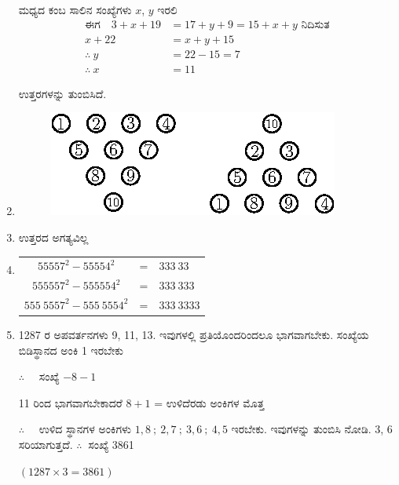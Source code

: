 \begin{enumerate}
ಮಧ್ಯದ ಕಂಬ ಸಾಲಿನ ಸಂಖ್ಯೆಗಳು $x$, $y$ ಇರಲಿ 
\begin{align*}
\text{ಈಗ}\quad 3 + x + 19 & = 17 + y + 9 = 15 + x + y \text{ ನಿದಿಸುತ} \\
x + 22 & = x + y + 15\\
\therefore~ y & = 22 - 15 = 7\\
\therefore~ x & = 11
\end{align*}

ಉತ್ತರಗಳನ್ನು ತುಂಬಿಸಿದೆ. 

\item 
\begin{figure}[H]
\centering
\includegraphics{images/chap10/ans27.eps}
\end{figure}

\item ಉತ್ತರದ ಅಗತ್ಯವಿಲ್ಲ 

\item 
\begin{tabular}[t]{ccl}
$55557^{2} - 55554^{2}$ & = & $333~33$\\
$555557^{2} - 555554^{2}$ & = & $333~333$\\
$555~5557^{2} - 555~5554^{2}$ & = & $333~3333$
\end{tabular}

\item 1287 ರ ಅಪವರ್ತನಗಳು 9, 11, 13. ಇವುಗಳಲ್ಲಿ ಪ್ರತಿಯೊಂದರಿಂದಲೂ ಭಾಗವಾಗಬೇಕು. ಸಂಖ್ಯೆಯ ಬಿಡಿಸ್ಥಾನದ ಅಂಕಿ 1 ಇರಬೇಕು 

$\therefore\quad$ ಸಂಖ್ಯೆ  $ - 8 - 1$

11 ರಿಂದ ಭಾಗವಾಗಬೇಕಾದರೆ $8 + 1$ = ಉಳಿದೆರಡು ಅಂಕಿಗಳ ಮೊತ್ತ 

$\therefore\quad$ ಉಳಿದ ಸ್ಥಾನಗಳ ಅಂಕಿಗಳು $1, 8 ~;~ 2, 7 ~;~ 3, 6 ~;~ 4, 5$ ಇರಬೇಕು. ಇವುಗಳನ್ನು ತುಂಬಿಸಿ ನೋಡಿ. 3, 6 ಸರಿಯಾಗುತ್ತದೆ. $\therefore~$ ಸಂಖ್ಯೆ 3861

$(1287\times 3 = 3861)$
\end{enumerate}
